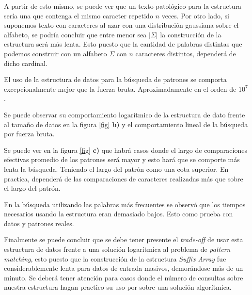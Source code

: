 \documentclass[]{article}
\begin{document}
A partir de esto mismo, se puede ver que un texto patológico para la estructura sería una que contenga el mismo caracter repetido $n$ veces. Por otro lado, si suponemos texto con caracteres al azar con una distribución gaussiana sobre el alfabeto, se podría concluir que entre menor sea $|\Sigma|$ la construcción de la estructura será más lenta. Esto puesto que la cantidad de palabras distintas que podemos construir con un alfabeto $\Sigma$ con $n$ caracteres distintos, dependerá de dicho cardinal.

El uso de la estructura de datos para la búsqueda de patrones se comporta excepcionalmente mejor que la fuerza bruta. Aproximadamente en el orden de $10^{7}$. 

Se puede observar su comportamiento logarítmico de la estructura de dato frente al tamaño de datos en la figura \ref{fig} \textbf{b)} y el comportamiento lineal de la búsqueda por fuerza bruta.

Se puede ver en la figura \ref{fig} \textbf{c)} que habrá casos donde el largo de comparaciones efectivas promedio de los patrones será mayor y esto hará que se comporte más lenta la búsqueda. Teniendo el largo del patrón como una cota superior. En practica, dependerá de las comparaciones de caracteres realizadas más que sobre el largo del patrón.

En la búsqueda utilizando las palabras más frecuentes se observó que los tiempos necesarios usando la estructura eran demasiado bajos. Esto como prueba con datos y patrones reales.

Finalmente se puede concluir que se debe tener presente el \emph{trade-off} de usar esta estructura de datos frente a una solución logarítmica al problema de \emph{pattern matching}, esto puesto que la construcción de la estructura \emph{Suffix Array} fue considerablemente lenta para datos de entrada masivos, demorándose más de un minuto. Se deberá tener atención para casos donde el número de consultas sobre nuestra estructura hagan practico su uso por sobre una solución algorítmica.


\end{document}
